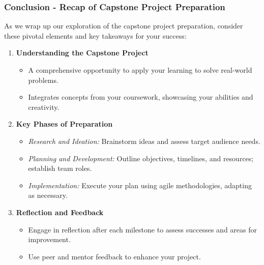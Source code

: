\documentclass[aspectratio=169]{beamer}
\begin{document}
\begin{frame}[fragile]
  \frametitle{Conclusion - Recap of Capstone Project Preparation}
  As we wrap up our exploration of the capstone project preparation, consider these pivotal elements and key takeaways for your success:

  \begin{enumerate}
    \item \textbf{Understanding the Capstone Project}
      \begin{itemize}
        \item A comprehensive opportunity to apply your learning to solve real-world problems.
        \item Integrates concepts from your coursework, showcasing your abilities and creativity.
      \end{itemize}
      
    \item \textbf{Key Phases of Preparation}
      \begin{itemize}
        \item \textit{Research and Ideation:} Brainstorm ideas and assess target audience needs.
        \item \textit{Planning and Development:} Outline objectives, timelines, and resources; establish team roles.
        \item \textit{Implementation:} Execute your plan using agile methodologies, adapting as necessary.
      \end{itemize}
      
    \item \textbf{Reflection and Feedback}
      \begin{itemize}
        \item Engage in reflection after each milestone to assess successes and areas for improvement.
        \item Use peer and mentor feedback to enhance your project.
      \end{itemize}
  \end{enumerate}
\end{frame}
\end{document}
